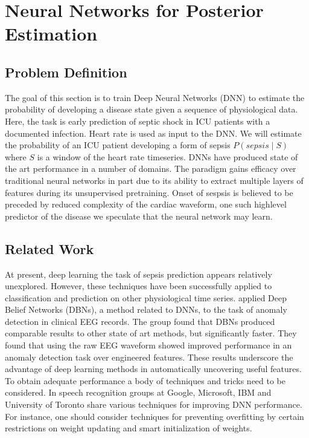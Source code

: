 \documentclass[12pt,solutions]{article}
\begin{document}
\section{Neural Networks for Posterior Estimation}

\subsection{Problem Definition}
The goal of this section is to train Deep Neural Networks (DNN) to estimate the probability of developing a disease state given a sequence of
physiological data. Here, the task is early prediction of septic shock in ICU patients with a documented infection. Heart rate is used as input to
the DNN. We will estimate the probability of an ICU patient developing a form of sepsis $P(sepsis \mid S)$ where $S$ is a window of the 
heart rate timeseries. DNNs have produced state of the art performance in a number of domains. The paradigm gains efficacy over traditional neural networks in part due to its ability to extract multiple layers of features during its unsupervised pretraining. Onset of sespsis is believed to be preceded by reduced complexity of the cardiac waveform, one such highlevel predictor of the disease we speculate that the neural network may learn. 

\subsection{Related Work}

At present, deep learning the task of sepsis prediction appears relatively unexplored. However, these techniques have been successfully applied to classification and prediction on other physiological time series. \cite{wulsin2011modeling} applied Deep Belief Networks (DBNs), a method related to DNNs, to the task of anomaly detection in clinical EEG records. The group found that 
DBNs produced comparable results to other state of art methods, but significantly faster. They found
that using the raw EEG waveform showed improved performance in an
anomaly detection task over engineered features.
These results underscore the advantage of deep learning methods in 
automatically uncovering useful features. \\

To obtain adequate performance a body of techniques and tricks need to be considered. In \cite{hinton2012deep} speech recognition groups at Google, Microsoft, IBM and University of Toronto share various techniques for improving DNN performance. For instance, one should consider techniques for
preventing overfitting by certain restrictions on weight updating and smart initialization of weights.
\end{document}
